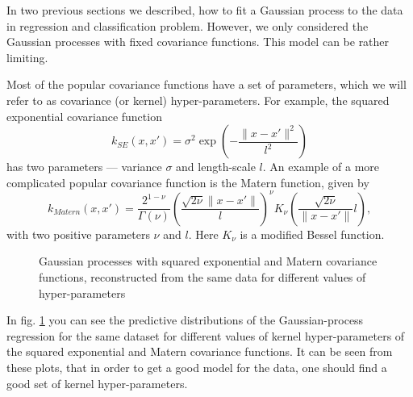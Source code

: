 In two previous sections we described, how to fit a Gaussian process to the data in regression and classification problem. However, we only considered the Gaussian processes with fixed covariance functions. This model can be rather limiting.

Most of the popular covariance functions have a set of parameters, which we will refer to as covariance (or kernel) hyper-parameters. For example, the squared exponential covariance function
$$k_{SE}(x, x') = \sigma^2 \exp\left( - \frac{\|x - x'\|^2}{l^2}\right)$$
has two parameters — variance $\sigma$ and length-scale $l$. An example of a more complicated popular covariance function is the Matern function, given by
$$k_{Matern}(x, x') = \frac{2^{1 - \nu}} {\Gamma(\nu)} \left(\frac{\sqrt{2 \nu}\|x - x'\|}{l}\right)^{\nu} K_{\nu} \left( \frac{\sqrt{2 \nu}}{\|x - x'\|}{l}\right),$$ 
with two positive parameters $\nu$ and $l$. Here $K_{\nu}$ is a modified Bessel function.

\begin{figure}[!h]
	\centering

	\subfloat{
		\scalebox{0.8}{
		\hspace{-1cm}
			
		}
	}
	\subfloat{
		\scalebox{0.8}{
		\hspace{-1cm}
			
		}
	} 
	\subfloat{
		\scalebox{0.8}{
		\hspace{-1cm}
			
		}
	}

	\subfloat{
		\scalebox{0.8}{
		\hspace{-1cm}
			
		}
	}
	\subfloat{
		\scalebox{0.8}{
		\hspace{-1cm}
			
		}
	}
	\subfloat{
		\scalebox{0.8}{
		\hspace{-1cm}
			
		}
	}
	\caption{Gaussian processes with squared exponential and Matern covariance functions, reconstructed from the same data for different values of hyper-parameters}
	\label{cov_examples}
\end{figure}

In fig. \ref{cov_examples} you can see the predictive distributions of the Gaussian-process regression for the same dataset for different values of kernel hyper-parameters of the squared exponential and Matern covariance functions. It can be seen from these plots, that in order to get a good model for the data, one should find a good set of kernel hyper-parameters.

